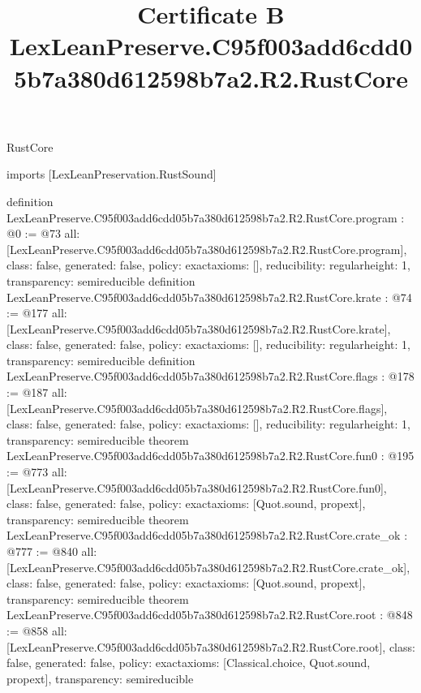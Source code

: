 \begin{lexlean}{RustCore}
\title{Certificate B LexLeanPreserve.C95f003add6cdd05b7a380d612598b7a2.R2.RustCore}
\begin{coremodule}
imports [LexLeanPreservation.RustSound]

definition LexLeanPreserve.C95f003add6cdd05b7a380d612598b7a2.R2.RustCore.program : @0 := @73 {
  all: [LexLeanPreserve.C95f003add6cdd05b7a380d612598b7a2.R2.RustCore.program],
  class: false,
  generated: false,
  policy: exact{axioms: []},
  reducibility: regular{height: 1},
  transparency: semireducible
}
definition LexLeanPreserve.C95f003add6cdd05b7a380d612598b7a2.R2.RustCore.krate : @74 := @177 {
  all: [LexLeanPreserve.C95f003add6cdd05b7a380d612598b7a2.R2.RustCore.krate],
  class: false,
  generated: false,
  policy: exact{axioms: []},
  reducibility: regular{height: 1},
  transparency: semireducible
}
definition LexLeanPreserve.C95f003add6cdd05b7a380d612598b7a2.R2.RustCore.flags : @178 := @187 {
  all: [LexLeanPreserve.C95f003add6cdd05b7a380d612598b7a2.R2.RustCore.flags],
  class: false,
  generated: false,
  policy: exact{axioms: []},
  reducibility: regular{height: 1},
  transparency: semireducible
}
theorem LexLeanPreserve.C95f003add6cdd05b7a380d612598b7a2.R2.RustCore.fun0 : @195 := @773 {
  all: [LexLeanPreserve.C95f003add6cdd05b7a380d612598b7a2.R2.RustCore.fun0],
  class: false,
  generated: false,
  policy: exact{axioms: [Quot.sound, propext]},
  transparency: semireducible
}
theorem LexLeanPreserve.C95f003add6cdd05b7a380d612598b7a2.R2.RustCore.crate_ok : @777 := @840 {
  all: [LexLeanPreserve.C95f003add6cdd05b7a380d612598b7a2.R2.RustCore.crate_ok],
  class: false,
  generated: false,
  policy: exact{axioms: [Quot.sound, propext]},
  transparency: semireducible
}
theorem LexLeanPreserve.C95f003add6cdd05b7a380d612598b7a2.R2.RustCore.root : @848 := @858 {
  all: [LexLeanPreserve.C95f003add6cdd05b7a380d612598b7a2.R2.RustCore.root],
  class: false,
  generated: false,
  policy: exact{axioms: [Classical.choice, Quot.sound, propext]},
  transparency: semireducible
}


\end{coremodule}
\end{lexlean}

